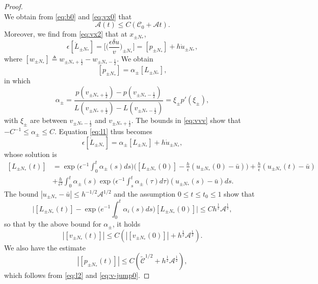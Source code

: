 \documentclass[10pt,a4paper]{amsart}
\begin{document}
\begin{proof}
\begin{equation}
\end{equation}
We obtain from \eqref{eq:b0} and \eqref{eq:vx0} that
 \begin{equation}\label{eq:est-a0}
  \mathscr{A}(t)\leq C(\mathscr{C}_0+\mathscr{A}t).
\end{equation}
Moreover, we find from \eqref{eq:vx2} that at \(x_{\pm N_* }\),
\begin{equation}\label{eq:l1}
  \epsilon[\dot{L}_{\pm N_* }]=\Big[\big(\frac{\epsilon\delta u}{v}\big)_{\pm N_* }\Big]=[p_{\pm N_* }]+h\dot{u}_{\pm N_* },
\end{equation}
where \([w_{\pm N_* }]\triangleq w_{\pm N_* +\frac12}-w_{\pm N_* -\frac12}\). We obtain
\begin{equation}\label{eq:l2}
 [p_{\pm N_* }]=\alpha_\pm[L_{\pm N_* }],
\end{equation}
in which 
\begin{equation}\label{eq:l3}
 \alpha_{\pm}=\frac{p(v_{\pm N_* +\frac12})-p(v_{\pm N_* -\frac12})}{L(v_{\pm N_* +\frac12})-L(v_{\pm N_* -\frac12})}=\xi_\pm p'(\xi_\pm),
\end{equation}
with $\xi_\pm$ are between $v_{\pm N_* -\frac12}$ and $v_{\pm N_* +\frac12}$. 
The bounds in \eqref{eq:vvv} show that $-C^{-1}\leq\alpha_\pm\leq C$. Equation \eqref{eq:l1} thus becomes
\begin{equation}\label{eq:l4}
  \epsilon[\dot{L}_{\pm N_* }]=\alpha_\pm[L_{\pm N_* }]+h\dot{u}_{\pm N_* },
\end{equation}
whose solution is
\[\begin{aligned}
[L_{\pm N_* }(t)]& =\exp\Big(\epsilon^{-1}\int_{0}^{t}\alpha_{\pm}(s)ds\Big)\Big([L_{\pm N_* }(0)]-\frac{h}{\epsilon}(u_{\pm N_* }(0)-\bar u)\Big)+\frac{h}{\epsilon}(u_{\pm N_* }(t) -\bar u) \\
&+\frac{h}{\epsilon^{2}}\int_{0}^{t}\alpha_{\pm}(s)\exp\Big(\epsilon^{-1}\int_{s}^{t}\alpha_{\pm}(\tau)d\tau\Big)(u_{\pm N_* }(s) -\bar u)ds.
\end{aligned}\]
The bound \(|u_{\pm N_* }-\bar u|\leq h^{-1/2}\mathscr{A}^{1/2}\) and the assumption $0\leq t\leq t_0\leq 1$ show that
\begin{equation}\label{eq:lnv-jump0}\Big|[L_{\pm N_* }(t)]-\exp\Big(e^{-1}\int_{0}^{t}\alpha_{i}(s)ds\Big)[L_{\pm N_* }(0)]\Big|\leq Ch^{\frac12}\mathscr{A}^{\frac12},\end{equation}
so that by the above bound for \(\alpha_\pm\), it holds
\begin{equation}\label{eq:v-jump0}\left|[v_{\pm N_* }(t)]\right|\leq C(\left|[v_{\pm N_* }(0)]\right|+h^{\frac12}\mathscr{A}^{\frac12}).\end{equation}
We also have the estimate
\begin{equation}\label{eq220}
|[p_{\pm N_* }(t)]|\leq C(\tilde{\mathscr{C}}^{1/2}+h^{\frac12}\mathscr{A}^{\frac12}),
\end{equation}
which follows from \eqref{eq:l2} and \eqref{eq:v-jump0}. 




\end{proof}
\end{document}
